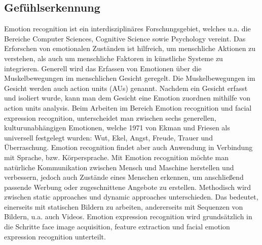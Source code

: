 \subsection{Gefühlserkennung}
Emotion recognition ist ein interdisziplinäres Forschungsgebiet, welches u.a. die Bereiche Computer Sciences, Cognitive Science sowie Psychology vereint. Das Erforschen von emotionalen Zuständen ist hilfreich, um menschliche Aktionen zu verstehen, als auch um menschliche Faktoren in künstliche Systeme zu integrieren.\cite{eyetrackemotionrec}
Generell wird das Erfassen von Emotionen über die Muskelbewegungen im menschlichen Gesicht geregelt. Die Muskelbewegungen im Gesicht werden auch action units (AUs) genannt. Nachdem ein Gesicht erfasst und isoliert wurde, kann man dem Gesicht eine Emotion zuordnen mithilfe von action units analysis.\cite{wildemotionrec}
Beim Arbeiten im Bereich Emotion recognition und facial expression recognition, unterscheidet man zwischen sechs generellen, kulturunabhängigen Emotionen, welche 1971 von Ekman und Friesen als universell festgelegt wurden: Wut, Ekel, Angst, Freude, Trauer und Überraschung.\cite{cnnemotionrec}
Emotion recognition findet aber auch Anwendung in Verbindung mit Sprache, bzw. Körpersprache. Mit Emotion recognition möchte man natürliche Kommunikation zwischen Mensch und Maschine herstellen und verbessern, jedoch auch Zustände eines Menschen erkennen, um anschließend passende Werbung oder zugeschnittene Angebote zu erstellen. Methodisch wird zwischen static approaches und dynamic approaches unterschieden. Das bedeutet, einerseits mit statischen Bildern zu arbeiten, andererseits mit Sequenzen von Bildern, u.a. auch Videos. Emotion expression recognition wird grundsätzlich in die Schritte face image acquisition, feature extraction und facial emotion expression recognition unterteilt. \cite{facialemotionrecusingcnn}
\\
